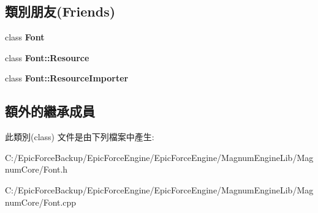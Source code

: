 \subsection*{類別朋友(Friends)}
\begin{DoxyCompactItemize}
\item 
class {\bfseries Font}\hypertarget{class_magnum_1_1_font_1_1_resource_importer_ad564b94b59dc295de3dfc4415d95cca8}{}\label{class_magnum_1_1_font_1_1_resource_importer_ad564b94b59dc295de3dfc4415d95cca8}

\item 
class {\bfseries Font\+::\+Resource}\hypertarget{class_magnum_1_1_font_1_1_resource_importer_aed1576435da2fd6be67b0972d456c130}{}\label{class_magnum_1_1_font_1_1_resource_importer_aed1576435da2fd6be67b0972d456c130}

\item 
class {\bfseries Font\+::\+Resource\+Importer}\hypertarget{class_magnum_1_1_font_1_1_resource_importer_adcf31f02b1c16e69102f4d80f9a06dfd}{}\label{class_magnum_1_1_font_1_1_resource_importer_adcf31f02b1c16e69102f4d80f9a06dfd}

\end{DoxyCompactItemize}
\subsection*{額外的繼承成員}


此類別(class) 文件是由下列檔案中產生\+:\begin{DoxyCompactItemize}
\item 
C\+:/\+Epic\+Force\+Backup/\+Epic\+Force\+Engine/\+Epic\+Force\+Engine/\+Magnum\+Engine\+Lib/\+Magnum\+Core/Font.\+h\item 
C\+:/\+Epic\+Force\+Backup/\+Epic\+Force\+Engine/\+Epic\+Force\+Engine/\+Magnum\+Engine\+Lib/\+Magnum\+Core/Font.\+cpp\end{DoxyCompactItemize}
